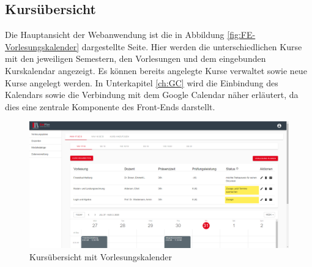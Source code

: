 \subsection{Kursübersicht}
Die Hauptansicht der Webanwendung ist die in Abbildung \vref{fig:FE-Vorlesungskalender} dargestellte Seite.
Hier werden die unterschiedlichen Kurse mit den jeweiligen Semestern, den Vorlesungen und dem eingebunden Kurskalendar angezeigt. 
Es können bereits angelegte Kurse verwaltet sowie neue Kurse angelegt werden. 
In Unterkapitel \vref{ch:GC} wird die Einbindung des Kalendars sowie die Verbindung mit dem Google Calendar näher erläutert, da dies eine zentrale Komponente des Front-Ends darstellt.
\begin{figure}[H]
	\centering 
	\includegraphics[width=\textwidth]{img/FrontEnd/Vorlesungskalender.png}
	\caption[Kursübersicht mit Vorlesungskalender]{\label{fig:FE-Vorlesungskalender}Kursübersicht mit Vorlesungskalender}
\end{figure}

